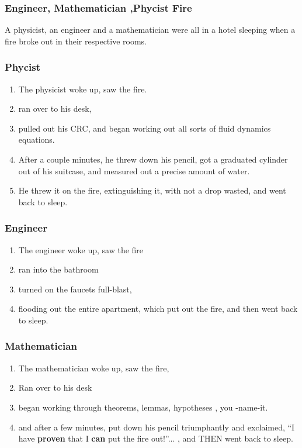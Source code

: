 

\begin{frame}
\frametitle{Engineer, Mathematician ,Phycist Fire}

{\small A physicist, an engineer and a mathematician were all in a hotel
sleeping when a fire broke out in their respective rooms.} 
\end{frame} 

\begin{frame}
\frametitle{ Phycist} 

\begin{enumerate} 
\small \item \small The physicist woke up, saw the fire. 
\item \small  ran over to his desk, 
\item \small pulled out his CRC, and began working out all sorts of fluid dynamics
equations. 
\item \small After a couple minutes, he threw down his pencil, got
a graduated cylinder out of his suitcase, and measured out a
precise amount of water. 
\item \small He threw it on the fire, extinguishing
it, with not a drop wasted, and went back to sleep.
\end{enumerate}
\end{frame}

\begin{frame}
\frametitle{Engineer} 
\begin{enumerate} 
\small \item \small The engineer woke up, saw the fire
\item \small ran into the bathroom
\item \small turned on the faucets full-blast,
\item \small flooding out the entire apartment, which put out the
  fire, and then went back to sleep.
\end{enumerate}
\end{frame}

\begin{frame} 
\frametitle{Mathematician}
\begin{enumerate}
\small \item \small The mathematician woke up, saw the fire, 
\item \small Ran over to his desk
\item \small began working through theorems,
  lemmas, hypotheses , you -name-it. 
\item \small and after a few minutes, put down his pencil triumphantly
  and exclaimed, ``I have \textbf{proven} that I \textbf{can} put the fire
  out!''... , and THEN went back to sleep. 
\end{enumerate} 

\end{frame}



